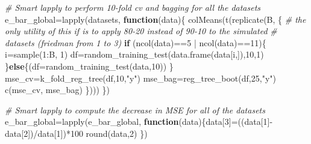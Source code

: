 \documentclass[
]{article}
\newenvironment{Shaded}{\begin{snugshade}}{\end{snugshade}}
\newcommand{\AttributeTok}[1]{\textcolor[rgb]{0.77,0.63,0.00}{#1}}
\newcommand{\CommentTok}[1]{\textcolor[rgb]{0.56,0.35,0.01}{\textit{#1}}}
\newcommand{\ControlFlowTok}[1]{\textcolor[rgb]{0.13,0.29,0.53}{\textbf{#1}}}
\newcommand{\DecValTok}[1]{\textcolor[rgb]{0.00,0.00,0.81}{#1}}
\newcommand{\FunctionTok}[1]{\textcolor[rgb]{0.00,0.00,0.00}{#1}}
\newcommand{\NormalTok}[1]{#1}
\newcommand{\OtherTok}[1]{\textcolor[rgb]{0.56,0.35,0.01}{#1}}
\newcommand{\SpecialCharTok}[1]{\textcolor[rgb]{0.00,0.00,0.00}{#1}}
\newcommand{\StringTok}[1]{\textcolor[rgb]{0.31,0.60,0.02}{#1}}
\begin{document}
\begin{Shaded}
\begin{Highlighting}[]
\CommentTok{\# Smart lapply to perform 10{-}fold cv and bagging for all the datasets}
\NormalTok{e\_bar\_global}\OtherTok{=}\FunctionTok{lapply}\NormalTok{(datasets, }\ControlFlowTok{function}\NormalTok{(data)\{}
  \FunctionTok{colMeans}\NormalTok{(}\FunctionTok{t}\NormalTok{(}\FunctionTok{replicate}\NormalTok{(B, \{}
  \CommentTok{\# the only utility of this if is to apply 80{-}20 instead of 90{-}10 to the simulated}
  \CommentTok{\# datasets (friedman from 1 to 3)  }
  \ControlFlowTok{if}\NormalTok{ (}\FunctionTok{ncol}\NormalTok{(data)}\SpecialCharTok{==}\DecValTok{5} \SpecialCharTok{|} \FunctionTok{ncol}\NormalTok{(data)}\SpecialCharTok{==}\DecValTok{11}\NormalTok{)\{}
\NormalTok{    i}\OtherTok{=}\FunctionTok{sample}\NormalTok{(}\DecValTok{1}\SpecialCharTok{:}\NormalTok{B, }\DecValTok{1}\NormalTok{)}
\NormalTok{    df}\OtherTok{=}\FunctionTok{random\_training\_test}\NormalTok{(}\FunctionTok{data.frame}\NormalTok{(data[i,]),}\DecValTok{10}\NormalTok{,}\DecValTok{1}\NormalTok{)}
\NormalTok{  \}}\ControlFlowTok{else}\NormalTok{\{(}\AttributeTok{df=}\FunctionTok{random\_training\_test}\NormalTok{(data,}\DecValTok{10}\NormalTok{))}
\NormalTok{  \}}
\NormalTok{  mse\_cv}\OtherTok{=}\FunctionTok{k\_fold\_reg\_tree}\NormalTok{(df,}\DecValTok{10}\NormalTok{,}\StringTok{"y"}\NormalTok{)}
\NormalTok{  mse\_bag}\OtherTok{=}\FunctionTok{reg\_tree\_boot}\NormalTok{(df,}\DecValTok{25}\NormalTok{,}\StringTok{"y"}\NormalTok{)}
  \FunctionTok{c}\NormalTok{(mse\_cv, mse\_bag)}
\NormalTok{\})))}
\NormalTok{\})}

\CommentTok{\# Smart lapply to compute the decrease in MSE for all of the datasets}
\NormalTok{e\_bar\_global}\OtherTok{=}\FunctionTok{lapply}\NormalTok{(e\_bar\_global, }
                    \ControlFlowTok{function}\NormalTok{(data)\{data[}\DecValTok{3}\NormalTok{]}\OtherTok{=}\NormalTok{((data[}\DecValTok{1}\NormalTok{]}\SpecialCharTok{{-}}\NormalTok{data[}\DecValTok{2}\NormalTok{])}\SpecialCharTok{/}\NormalTok{data[}\DecValTok{1}\NormalTok{])}\SpecialCharTok{*}\DecValTok{100}
                                  \FunctionTok{round}\NormalTok{(data,}\DecValTok{2}\NormalTok{)}
\NormalTok{  \})}
\end{Highlighting}
\end{Shaded}
\end{document}
